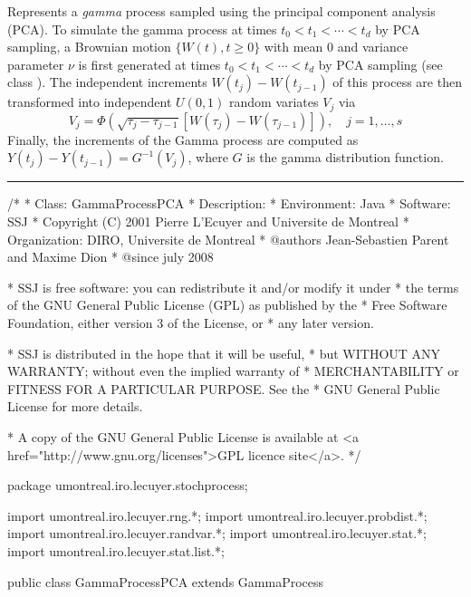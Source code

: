 
Represents a \emph{gamma} process sampled using the principal
component analysis (PCA).  To simulate the gamma process at times
$t_0 < t_1 < \cdots < t_d$ by PCA sampling, a Brownian
motion $\{ W(t), t \geq 0 \}$ with mean $0$ and variance parameter $\nu$ is
first generated at times $t_0 < t_1 < \cdots < t_d$
by PCA sampling (see class ).
The independent increments $W(t_{j}) - W(t_{j-1})$ of this process
are then transformed into independent $U(0, 1)$ random variates $V_{j}$ via
$$ V_j = \Phi\left(\sqrt{\tau_j-\tau_{j-1}} [W(\tau_j)-W(\tau_{j-1})]\right),
\quad j=1,\dots,s $$
Finally, the increments of the Gamma process are computed as
$ Y(t_{j}) - Y(t_{j-1}) = G^{-1}(V_j)$, where $G$ is the gamma distribution
 function.

\bigskip\hrule\bigskip

\begin{code}
\begin{hide}
/*
 * Class:        GammaProcessPCA
 * Description:
 * Environment:  Java
 * Software:     SSJ
 * Copyright (C) 2001  Pierre L'Ecuyer and Universite de Montreal
 * Organization: DIRO, Universite de Montreal
 * @authors      Jean-Sebastien Parent and Maxime Dion
 * @since        july 2008

 * SSJ is free software: you can redistribute it and/or modify it under
 * the terms of the GNU General Public License (GPL) as published by the
 * Free Software Foundation, either version 3 of the License, or
 * any later version.

 * SSJ is distributed in the hope that it will be useful,
 * but WITHOUT ANY WARRANTY; without even the implied warranty of
 * MERCHANTABILITY or FITNESS FOR A PARTICULAR PURPOSE.  See the
 * GNU General Public License for more details.

 * A copy of the GNU General Public License is available at
   <a href="http://www.gnu.org/licenses">GPL licence site</a>.
 */
\end{hide}
package umontreal.iro.lecuyer.stochprocess;\begin{hide}
import umontreal.iro.lecuyer.rng.*;
import umontreal.iro.lecuyer.probdist.*;
import umontreal.iro.lecuyer.randvar.*;
import umontreal.iro.lecuyer.stat.*;
import umontreal.iro.lecuyer.stat.list.*;
\end{hide}

public class GammaProcessPCA extends GammaProcess \begin{hide} {
    double[] arrayTime;
    BrownianMotionPCA BMPCA;

\end{hide}
\end{code}
